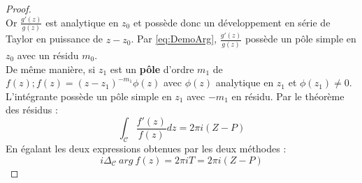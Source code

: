 \begin{proof}
\begin{equation}
\label{eq:DemoArg}
\end{equation}
Or $\frac{g'(z)}{g(z)}$ est analytique en $z_0$ et possède donc un développement en série
de Taylor en puissance de $z-z_0$. Par \autoref{eq:DemoArg}, $\frac{g'(z)}{g(z)}$ possède 
un p\^ole simple en $z_0$ avec un résidu $m_0$.\\
De même manière, si $z_1$ est un \textbf{pôle} d'ordre $m_1$ de $f(z) ; f(z) = (z-z_1)^{-m_1}\phi(
z)$ avec $\phi(z)$ analytique en $z_1$ et $\phi(z_1)\neq0$. L'intégrante possède un pôle 
simple en $z_1$ avec $-m_1$ en résidu. Par le théorème des résidus :
\begin{equation}
\int_\mathcal{C} \frac{f'(z)}{f(z)}dz = 2\pi i(Z-P)
\end{equation}
En égalant les deux expressions obtenues par les deux méthodes :
\begin{equation}
i\Delta_\mathcal{C}\ arg\ f(z) = 2\pi i T = 2\pi i (Z-P)
\end{equation}
\end{proof}
        
        
        
        
        
        
        
        
        